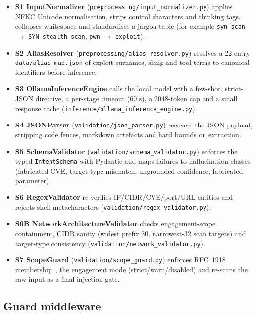 \begin{itemize}
\item \textbf{S1 InputNormalizer} (\texttt{preprocessing/input\allowbreak\_normalizer.py})
applies NFKC Unicode normalisation, strips control characters and thinking
tags, collapses whitespace and standardises a jargon table (for example
\texttt{syn scan} $\rightarrow$ \texttt{SYN stealth scan},
\texttt{pwn} $\rightarrow$ \texttt{exploit}).
\item \textbf{S2 AliasResolver} (\texttt{preprocessing/alias\allowbreak\_resolver.py})
resolves a 22-entry \texttt{data/alias\_map.json} of exploit surnames, slang
and tool terms to canonical identifiers before inference.
\item \textbf{S3 OllamaInferenceEngine} calls the local model with a few-shot,
strict-JSON directive, a per-stage timeout (60 s), a 2048-token cap and a
small response cache
(\texttt{inference/ollama\_inference\_engine.py}).
\item \textbf{S4 JSONParser} (\texttt{validation/json\_parser.py}) recovers the
JSON payload, stripping code fences, markdown artefacts and hard bounds on
extraction.
\item \textbf{S5 SchemaValidator} (\texttt{validation/schema\allowbreak\_validator.py})
enforces the typed \texttt{IntentSchema} with Pydantic and maps failures to
hallucination classes (fabricated CVE, target-type mismatch, ungrounded
confidence, fabricated parameter).
\item \textbf{S6 RegexValidator} re-verifies IP/CIDR/CVE/port/URL entities and
rejects shell metacharacters (\texttt{validation/regex\_validator.py}).
\item \textbf{S6B NetworkArchitectureValidator} checks engagement-scope
containment, CIDR sanity (widest prefix 30, narrowest-32 scan targets) and
target-type consistency (\texttt{validation/network\_validator.py}).
\item \textbf{S7 ScopeGuard} (\texttt{validation/scope\_guard.py}) enforces
RFC~1918 membership~\cite{rfc1918}, the engagement mode (strict/warn/disabled)
and re-scans the raw input as a final injection gate.
\end{itemize}

\subsection*{Guard middleware}

